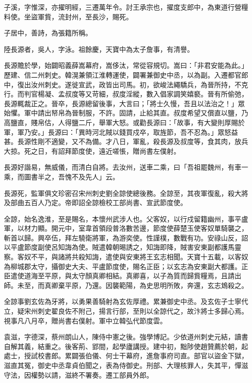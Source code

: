 \begin{pinyinscope}
 子溪，字惟深，亦擢明經，三遷萬年令。討王承宗也，擢度支郎中，為東道行營糧料使。坐盜軍貲，流封州，至長沙，賜死。



 子居中，善詩，為張籍所稱。



 陸長源者，吳人，字泳。祖餘慶，天寶中為太子詹事，有清譽。



 長源贍於學，始闢昭義薛嵩幕府，嵩侈汰，常從容規切。嵩曰：「非君安能為此。」歷建、信二州刺史。韓滉兼領江淮轉運使，闢署兼御史中丞，以為副。入遷都官郎中，復出汝州刺史。遂徙宣武，政皆出司馬。初，欲峻法繩驕兵，為晉所持，不克行。而判官楊凝、孟叔度等又苛細，叔度淫縱，數入倡家調笑嬉褻。晉有所偷弛，長源輒裁正之。晉卒，長源總留後事，大言曰；「將士久慢，吾且以法治之！」眾始懼。軍中請出帑帛為晉制服，不許。固請，止給其直。叔度希望又償直以鹽，乃高鹽直，賤帛估，人得鹽二斤，舉軍大怒。或勸長源曰：「故事，有大變則厚賜於軍，軍乃安。」長源曰：「異時河北賊以錢買戍卒，取旌節，吾不忍為。」眾怒益甚。長源性剛不適變，又不為備。才八日，軍亂，殺長源及叔度等，食其肉，放兵大掠。死之日，有詔拜節度使，遠近嗟悵，贈尚書左僕射。



 長源好諧易，無威儀，而清白自將。去汝州，送車二乘，曰「吾祖罷魏州，有車一乘，而圖書半之，吾愧不及先人」云。



 長源死，監軍俱文珍密召宋州刺史劉全諒使總後務。全諒至，其夜軍復亂，殺大將及部曲五百人乃定。帝即詔全諒檢校工部尚書、宣武節度使。



 全諒，始名逸淮，至是賜名，本懷州武涉人也。父客奴，以行戍留籍幽州，事平盧軍，以材力顯。開元中，室韋首領段普洛數苦邊，節度使薛楚玉使客奴單騎襲之，斬首以歸。興卒伍，拜左驍衛將軍，為游奕使。性謹樸，數戰有功。安祿山反，詔以平盧節度副使呂知誨為使。賊遣韓朝晹誘之，知誨即降，賊害安東副都護馬靈察。客奴不平，與諸將共殺知誨，遣使與安東將王玄志相聞。天寶十五載，以客奴為柳城郡太守，攝御史大夫、平盧節度使，賜名正臣；以玄志為安東副大都護。正臣遣使道海至平原，與太守顏真卿相結。真卿喜，以子為質而歸貲糧焉，且請出師。未至，而真卿棄平原，乃還。因襲範陽，為史思明所敗，奔還，玄志鴆殺之。



 全諒事劉玄佐為牙將，以勇果善騎射為玄佐厚禮。累兼御史中丞。及玄佐子士寧代立，疑宋州刺史翟良佐不附己，揚言行部，至則以全諒代之，故汴將士多歸心焉。視事凡八月卒，贈尚書右僕射。軍中立韓弘代節度雲。



 袁滋，字德深，蔡州朗山人，陳侍中憲之後。強學博記。少依道州刺史元結，讀書自解其義，結重之。後客荊、郢間，起學廬講授。建中初，黜陟使趙贊薦於朝，起處士，授試校書郎。累闢張伯儀、何士干幕府，進詹事府司直。部官以盜金下獄，滋直其冤，御史中丞韋貞伯聞之，表為侍御史。刑部、大理核罪人，失其平，憚滋守法，因權勢以請，滋終不署奏。遷工部員外郎。




\end{pinyinscope}
